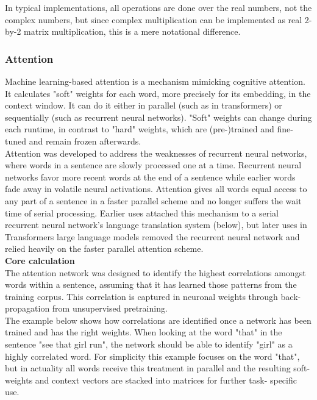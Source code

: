 In typical implementations, all operations are done over the real numbers, not the complex numbers, but since complex multiplication can be implemented as real 2-by-2 matrix multiplication, this is a mere notational difference.
\\

\subsubsection{\textbf{Attention}}
\cite{Attention}
Machine learning-based attention is a mechanism mimicking cognitive attention. It calculates "soft" weights for each word, more precisely for its embedding, in the context window. It can do it either in parallel (such as in transformers) or sequentially (such as recurrent neural networks). "Soft" weights can change during each runtime, in contrast to "hard" weights, which are (pre-)trained and fine-tuned and remain frozen afterwards.
\\

Attention was developed to address the weaknesses of recurrent neural networks, where words in a sentence are slowly processed one at a time. Recurrent neural networks favor more recent words at the end of a sentence while earlier words fade away in volatile neural activations. Attention gives all words equal access to any part of a sentence in a faster parallel scheme and no longer suffers the wait time of serial processing. Earlier uses attached this mechanism to a serial recurrent neural network's language translation system (below), but later uses in Transformers large language models removed the recurrent neural network and relied heavily on the faster parallel attention scheme.
\\

\textbf{Core calculation}\\
The attention network was designed to identify the highest correlations amongst words within a sentence, assuming that it has learned those patterns from the training corpus.  This correlation is captured in neuronal weights through back-propagation from unsupervised pretraining.
\\

The example below shows how correlations are identified once a network has been trained and has the right weights.  When looking at the word "that" in the sentence "see that girl run", the network should be able to identify "girl" as a highly correlated word.  For simplicity this example focuses on the word "that", but in actuality all words receive this treatment in parallel and the resulting soft-weights and context vectors are stacked into matrices for further task- specific use.
\\

